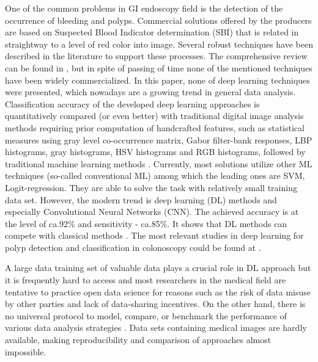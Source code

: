 \documentclass[preprint]{article}
\begin{document}
One of the common problems in GI endoscopy field is the detection of the occurrence of bleeding and polyps.  Commercial solutions offered by the producers are based on Suspected Blood Indicator determination (SBI) that is related in straightway to a level of red color into image. Several robust techniques have been described in the literature to support these processes. The comprehensive review can be found in \cite{Karargyris2010}, but in spite of passing of time none of the mentioned techniques have been widely commercialized.
In this paper, none of deep learning techniques were presented, which nowadays are a growing trend in general data analysis. Classification accuracy of the developed deep learning approaches is quantitatively compared (or even better) with traditional digital image analysis methods  requiring prior computation of handcrafted features, such as statistical measures using gray level co-occurrence matrix, Gabor filter-bank responses, LBP histograms, gray histograms, HSV histograms and RGB histograms, followed by traditional machine learning methods \cite{szczypinski2017qmazda}. Currently, most solutions utilize other ML techniques (so-called conventional ML) among which the leading ones are SVM, Logit-regression. They are able to solve the task with relatively small training data set. However, the modern trend is deep learning (DL) methods and especially Convolutional Neural Networks (CNN). The achieved accuracy is at the level of ca.92\% and sensitivity - ca.85\%. It shows that DL methods can compete with classical methods \cite{Greenspan2016, Shin2016}. The most relevant studies in deep learning for polyp detection and classification in colonoscopy could be found at \cite{Sing2020}.

A large data training set of valuable data plays a crucial role in DL approach but it is frequently hard to access and most researchers in the medical field are tentative to practice open data science for reasons such as the risk of data misuse by other parties and lack of data-sharing incentives. On the other hand, there is no universal protocol to model, compare, or benchmark the performance of various data analysis strategies \cite{Dinov2016}. Data sets containing medical images are hardly available, making reproducibility and comparison of approaches almost impossible. 
\end{document}
